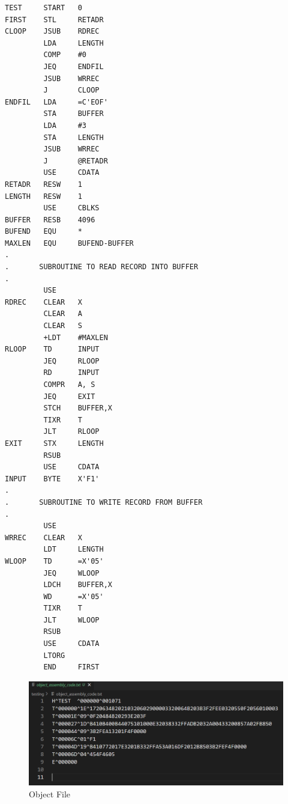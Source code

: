 \documentclass[
]{article}
\begin{document}
\begin{enumerate}
\begin{verbatim}
TEST     START   0            
FIRST    STL     RETADR            
CLOOP    JSUB    RDREC             
         LDA     LENGTH            
         COMP    #0                
         JEQ     ENDFIL            
         JSUB    WRREC             
         J       CLOOP             
ENDFIL   LDA     =C'EOF'               
         STA     BUFFER
         LDA     #3            
         STA     LENGTH
         JSUB    WRREC            
         J       @RETADR           
         USE     CDATA                      
RETADR   RESW    1
LENGTH   RESW    1
         USE     CBLKS
BUFFER   RESB    4096              
BUFEND   EQU     *
MAXLEN   EQU     BUFEND-BUFFER
.
.       SUBROUTINE TO READ RECORD INTO BUFFER
.
         USE
RDREC    CLEAR   X              
         CLEAR   A              
         CLEAR   S
         +LDT    #MAXLEN
RLOOP    TD      INPUT             
         JEQ     RLOOP             
         RD      INPUT            
         COMPR   A, S              
         JEQ     EXIT              
         STCH    BUFFER,X          
         TIXR    T            
         JLT     RLOOP            
EXIT     STX     LENGTH            
         RSUB
         USE     CDATA              
INPUT    BYTE    X'F1'             
.
.       SUBROUTINE TO WRITE RECORD FROM BUFFER
.
         USE
WRREC    CLEAR   X            
         LDT     LENGTH
WLOOP    TD      =X'05'        
         JEQ     WLOOP           
         LDCH    BUFFER,X        
         WD      =X'05'          
         TIXR    T            
         JLT     WLOOP             
         RSUB
         USE     CDATA   
         LTORG                  
         END     FIRST
\end{verbatim}
\vspace{0.5cm}
\begin{figure}[H]
\centering
\includegraphics{img/image-5.png}
\caption{Object File}
\end{figure}


\end{enumerate}
\end{document}
